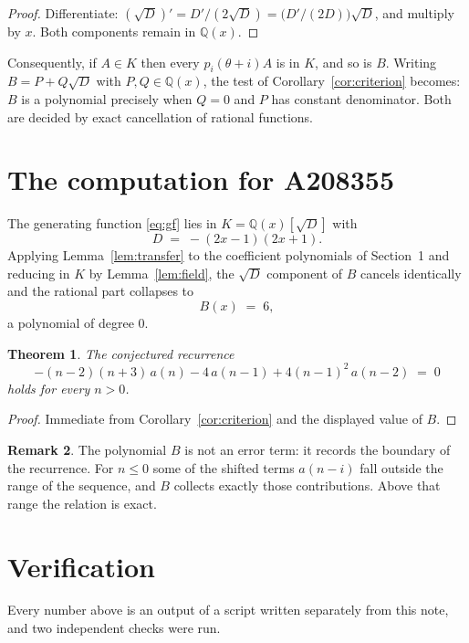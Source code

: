 \documentclass[11pt,a4paper]{article}
\theoremstyle{plain}
\newtheorem{theorem}{Theorem}
\theoremstyle{definition}
\newtheorem{remark}[theorem]{Remark}
\begin{document}
\begin{proof}
Differentiate: $(\sqrt{D})'=D'/(2\sqrt{D})=\bigl(D'/(2D)\bigr)\sqrt{D}$, and multiply by
$x$. Both components remain in $\mathbb{Q}(x)$.
\end{proof}

Consequently, if $A\in K$ then every $p_{i}(\theta+i)A$ is in $K$, and so is $B$. Writing
$B=P+Q\sqrt{D}$ with $P,Q\in\mathbb{Q}(x)$, the test of Corollary~\ref{cor:criterion}
becomes: $B$ is a polynomial precisely when $Q=0$ and $P$ has constant denominator. Both
are decided by exact cancellation of rational functions.

\section{The computation for A208355}

The generating function \eqref{eq:gf} lies in $K=\mathbb{Q}(x)[\sqrt{D}]$ with
\[
D \;=\; - \left(2 x - 1\right) \left(2 x + 1\right) .
\]
Applying Lemma~\ref{lem:transfer} to the coefficient polynomials of Section~1 and reducing
in $K$ by Lemma~\ref{lem:field}, the $\sqrt{D}$ component of $B$ cancels identically and
the rational part collapses to
\[
B(x)\;=\;6 ,
\]
a polynomial of degree $0$.

\begin{theorem}
The conjectured recurrence
\[
- \left(n - 2\right) \left(n + 3\right)\,a(n) - 4\,a(n-1) + 4 \left(n - 1\right)^{2}\,a(n-2) \;=\;0
\]
holds for every $n>0$.
\end{theorem}

\begin{proof}
Immediate from Corollary~\ref{cor:criterion} and the displayed value of $B$.
\end{proof}

\begin{remark}
The polynomial $B$ is not an error term: it records the boundary of the recurrence. For
$n\le0$ some of the shifted terms $a(n-i)$ fall outside the range of the sequence,
and $B$ collects exactly those contributions. Above that range the relation is exact.
\end{remark}

\section{Verification}

Every number above is an output of a script written separately from this note, and two
independent checks were run.
\end{document}
